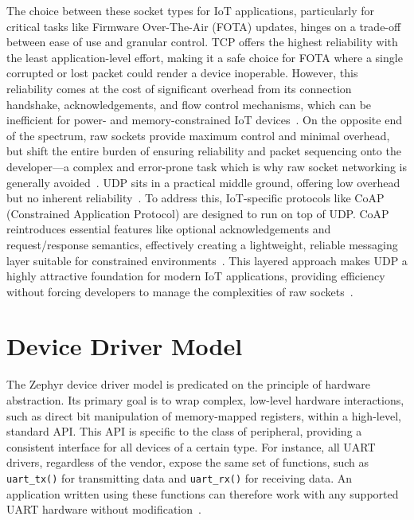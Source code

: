 The choice between these socket types for IoT applications, particularly for critical tasks like Firmware Over-The-Air (FOTA) updates, hinges on a trade-off between ease of use and granular control. TCP offers the highest reliability with the least application-level effort, making it a safe choice for FOTA where a single corrupted or lost packet could render a device inoperable. However, this reliability comes at the cost of significant overhead from its connection handshake, acknowledgements, and flow control mechanisms, which can be inefficient for power- and memory-constrained IoT devices~\cite{iot_book_protocols}. On the opposite end of the spectrum, raw sockets provide maximum control and minimal overhead, but shift the entire burden of ensuring reliability and packet sequencing onto the developer—a complex and error-prone task which is why raw socket networking is generally avoided~\cite{raw_sockets_limitations}. UDP sits in a practical middle ground, offering low overhead but no inherent reliability~\cite{iot_book_protocols}. To address this, IoT-specific protocols like CoAP (Constrained Application Protocol) are designed to run on top of UDP. CoAP reintroduces essential features like optional acknowledgements and request/response semantics, effectively creating a lightweight, reliable messaging layer suitable for constrained environments~\cite{coap_rfc}. This layered approach makes UDP a highly attractive foundation for modern IoT applications, providing efficiency without forcing developers to manage the complexities of raw sockets~\cite{iot_book_protocols}.

\section{Device Driver Model}

The Zephyr device driver model is predicated on the principle of hardware abstraction. Its primary goal is to wrap complex, low-level hardware interactions, such as direct bit manipulation of memory-mapped registers, within a high-level, standard API. This API is specific to the class of peripheral, providing a consistent interface for all devices of a certain type. For instance, all UART drivers, regardless of the vendor, expose the same set of functions, such as \texttt{uart\_tx()} for transmitting data and \texttt{uart\_rx()} for receiving data. An application written using these functions can therefore work with any supported UART hardware without modification~\cite{zephyr_device_driver_model}.


